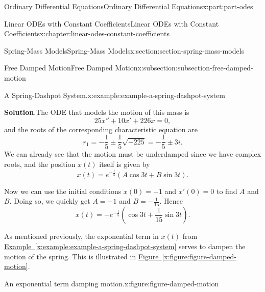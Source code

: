 \documentclass[twoside,10pt,]{book}
\newcommand{\blocktitlefont}{\relax}
\newcommand{\xreffont}{\relax}
\numberwithin{equation}{part}
\begin{document}
\begin{partptx}{Ordinary Differential Equations}{}{Ordinary Differential Equations}{}{}{x:part:part-odes}
\begin{chapterptx}{Linear ODEs with Constant Coefficients}{}{Linear ODEs with Constant Coefficients}{}{}{x:chapter:linear-odes-constant-coefficients}
\begin{sectionptx}{Spring-Mass Models}{}{Spring-Mass Models}{}{}{x:section:section-spring-mass-models}
\begin{subsectionptx}{Free Damped Motion}{}{Free Damped Motion}{}{}{x:subsection:subsection-free-damped-motion}
\begin{example}{A Spring-Dashpot System.}{x:example:example-a-spring-dashpot-system}
\par\smallskip%
\noindent\textbf{\blocktitlefont Solution}.\hypertarget{g:solution:idp105548815695008}{}\quad{}The ODE that models the motion of this mass is%
\begin{equation*}
25x'' + 10x' + 226x = 0,
\end{equation*}
and the roots of the corresponding characteristic equation are%
\begin{equation*}
r_{1} = -\frac{1}{5} \pm \frac{1}{5}\sqrt{-225} = -\frac{1}{5}\pm3i.
\end{equation*}
We can already see that the motion must be underdamped since we have complex roots, and the position \(x(t)\) itself is given by%
\begin{equation*}
x(t) = e^{-\frac{t}{5}}(A\cos3t + B\sin3t).
\end{equation*}
%
\par
Now we can use the initial conditions \(x(0) = -1\) and \(x'(0) = 0\) to find \(A\) and \(B\). Doing so, we quickly get \(A = -1\) and \(B = -\frac{1}{15}\). Hence%
\begin{equation*}
x(t) = -e^{-\frac{t}{5}}\left(\cos3t + \frac{1}{15}\sin3t\right).
\end{equation*}
%
\end{example}
As mentioned previously, the exponential term in \(x(t)\) from \hyperref[x:example:example-a-spring-dashpot-system]{Example~{\xreffont\ref{x:example:example-a-spring-dashpot-system}}} serves to dampen the motion of the spring. This is illustrated in \hyperref[x:figure:figure-damped-motion]{Figure~{\xreffont\ref{x:figure:figure-damped-motion}}}.%
\begin{figureptx}{An exponential term damping motion.}{x:figure:figure-damped-motion}{}%
\begin{image}{0.25}{0.5}{0.25}%
\end{image}
\end{figureptx}
\end{subsectionptx}
\end{sectionptx}
\end{chapterptx}
\end{partptx}
\end{document}
